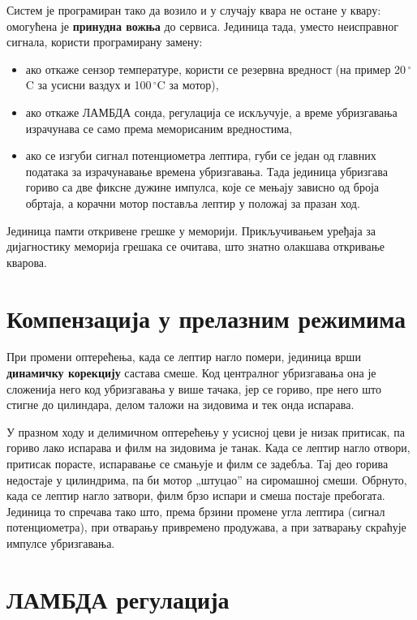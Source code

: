 \documentclass{report}
\begin{document}
Систем је програмиран тако да возило и у случају квара не остане у квару:
омогућена је \textbf{принудна вожња} до сервиса. Јединица тада, уместо
неисправног сигнала, користи програмирану замену:

\begin{itemize}[noitemsep]
    \item ако откаже сензор температуре, користи се резервна вредност (на
          пример 20\,$^\circ$C за усисни ваздух и 100\,$^\circ$C за мотор),
    \item ако откаже ЛАМБДА сонда, регулација се искључује, а време
          убризгавања израчунава се само према меморисаним вредностима,
    \item ако се изгуби сигнал потенциометра лептира, губи се један од главних
          података за израчунавање времена убризгавања. Тада јединица
          убризгава гориво са две фиксне дужине импулса, које се мењају
          зависно од броја обртаја, а корачни мотор поставља лептир у положај
          за празан ход.
\end{itemize}

Јединица памти откривене грешке у меморији. Прикључивањем уређаја за
дијагностику меморија грешака се очитава, што знатно олакшава откривање
кварова.

\section{Компензација у прелазним режимима}

При промени оптерећења, када се лептир нагло помери, јединица врши
\textbf{динамичку корекцију} састава смеше. Код централног убризгавања она је
сложенија него код убризгавања у више тачака, јер се гориво, пре него што
стигне до цилиндара, делом таложи на зидовима и тек онда испарава.

У празном ходу и делимичном оптерећењу у усисној цеви је низак притисак, па
гориво лако испарава и филм на зидовима је танак. Када се лептир нагло
отвори, притисак порасте, испаравање се смањује и филм се задебља. Тај део
горива недостаје у цилиндрима, па би мотор „штуцао” на сиромашној смеши.
Обрнуто, када се лептир нагло затвори, филм брзо испари и смеша постаје
пребогата. Јединица то спречава тако што, према брзини промене угла лептира
(сигнал потенциометра), при отварању привремено продужава, а при затварању
скраћује импулсе убризгавања.

\section{ЛАМБДА регулација}
\end{document}
